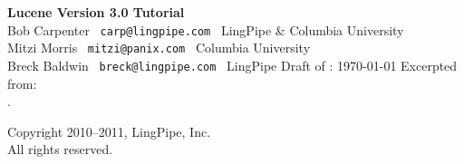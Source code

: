\documentclass[10pt]{book}
\begin{document}
\frontmatter
\pagestyle{empty}
\vspace*{1in}
\noindent
{\Huge\bf Lucene Version 3.0 Tutorial}
\\[1in]
{\LARGE Bob Carpenter} \ {\tt carp@lingpipe.com} \ LingPipe \& Columbia University
\\[8pt]
{\LARGE Mitzi Morris} \ {\tt mitzi@panix.com} \ Columbia University
\\[8pt]
{\LARGE Breck Baldwin} \ {\tt breck@lingpipe.com} \ LingPipe
\hspace*{1in}
\vfill
{ }
\vfill
\noindent
Draft of : \today
\vfill
\noindent
Excerpted from:
\\[12pt]
\hspace*{-2pt}{\Large\it Text Analysis with LingPipe 4.0}.
\\[4pt]
%
\pagestyle{empty}
\clearpage
\hspace*{12pt}
\vfill
\begin{center}
{\small
Copyright 2010--2011, LingPipe, Inc.
\\
All rights reserved.}
\end{center}
\vfill
{}
\vfill
\pagestyle{empty}
\clearpage
\mainmatter
\pagestyle{fancy}

\end{document}
